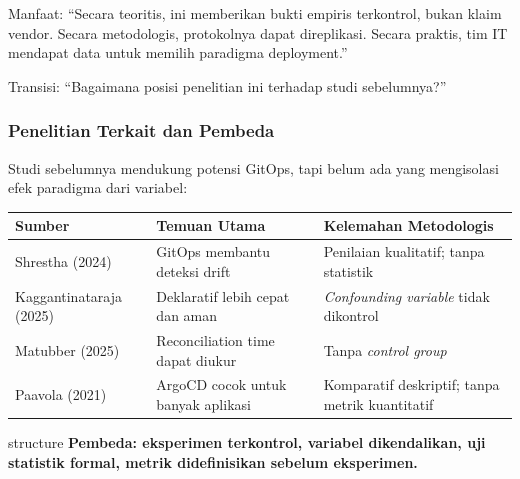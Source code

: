 {\begin{frame}
{Manfaat: ``Secara teoritis, ini memberikan bukti empiris terkontrol, bukan klaim vendor. Secara metodologis, protokolnya dapat direplikasi. Secara praktis, tim IT mendapat data untuk memilih paradigma deployment.''

Transisi: ``Bagaimana posisi penelitian ini terhadap studi sebelumnya?''
}
\end{frame}
}

{
\usebackgroundtemplate{\backgroundcontent}
\begin{frame}
    \frametitle{Penelitian Terkait dan Pembeda}
    \vspace{0.04cm}
    \scriptsize
    Studi sebelumnya mendukung potensi GitOps, tapi belum ada yang mengisolasi efek paradigma dari variabel:
    \vspace{0.04cm}
    \begin{tabular}{>{\raggedright\arraybackslash}p{2.6cm} >{\raggedright\arraybackslash}p{3.6cm} >{\raggedright\arraybackslash}p{4.8cm}}
        \toprule
        \textbf{Sumber} & \textbf{Temuan Utama} & \textbf{Kelemahan Metodologis} \\
        \midrule
        Shrestha (2024) & GitOps membantu deteksi drift & Penilaian kualitatif; tanpa statistik \\
        Kaggantinataraja (2025) & Deklaratif lebih cepat dan aman & \textit{Confounding variable} tidak dikontrol \\
        Matubber (2025) & Reconciliation time dapat diukur & Tanpa \textit{control group} \\
        Paavola (2021) & ArgoCD cocok untuk banyak aplikasi & Komparatif deskriptif; tanpa metrik kuantitatif \\
        \bottomrule
    \end{tabular}
    \vspace{0.12cm}
    \begin{beamercolorbox}[wd=\textwidth, sep=0.16cm, center, rounded=true]{structure}
        \small\bfseries Pembeda: eksperimen terkontrol, variabel dikendalikan, uji statistik formal, metrik didefinisikan sebelum eksperimen.
    \end{beamercolorbox}
\end{frame}
}

